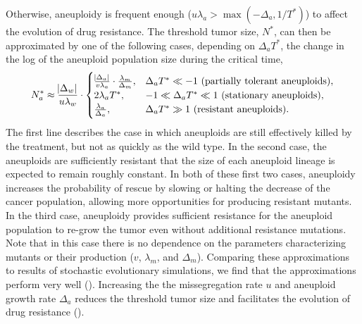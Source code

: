 \documentclass[12pt]{extarticle}
\begin{document}
Otherwise, aneuploidy is frequent enough ($u\lambda_a > \max{(-\Delta_a, 1/T^*)}$) to affect the evolution of drug resistance. 
The threshold tumor size, $N^*$, can then be approximated by one of the following cases, depending on $\Delta_a T^*$, the change in the log of the aneuploid population size during the critical time,
\begin{equation}  \label{eq:N_a}
\begin{aligned}
N_a^* \approx 
  \frac{\abs{\Delta_w}}{u\lambda_w} \cdot \begin{cases}
    \frac{\abs{\Delta_a}}{v\lambda_a} \cdot \frac{\lambda_m}{\Delta_m} ,&
  \Delta_a T^* \ll -1 \text{ (partially tolerant aneuploids)},\\ 
  2\lambda_a T^* ,&
  -1 \ll \Delta_a T^* \ll 1  \text{ (stationary aneuploids)},\\ 
  \frac{\lambda_a}{\Delta_a} ,&
   \Delta_a T^* \gg 1 \text{ (resistant aneuploids)}.
  \end{cases}
\end{aligned}
\end{equation}
The first line describes the case in which aneuploids are still effectively killed by the treatment, but not as quickly as the wild type. 
In the second case, the aneuploids are sufficiently resistant that the size of each aneuploid lineage is expected to remain roughly constant. 
In both of these first two cases, aneuploidy increases the probability of rescue by slowing or halting the decrease of the cancer population, allowing more opportunities for producing resistant mutants. 
In the third case, aneuploidy provides sufficient resistance for the aneuploid population to re-grow the tumor even without additional resistance mutations.
Note that in this case there is no dependence on the parameters characterizing mutants or their production ($v$, $\lambda_m$, and $\Delta_m$).
Comparing these approximations to results of stochastic evolutionary simulations, we find that the approximations perform very well (). Increasing the the missegregation rate $u$ and aneuploid growth rate $\Delta_a$ reduces the threshold tumor size and facilitates the evolution of drug resistance ().
\end{document}
